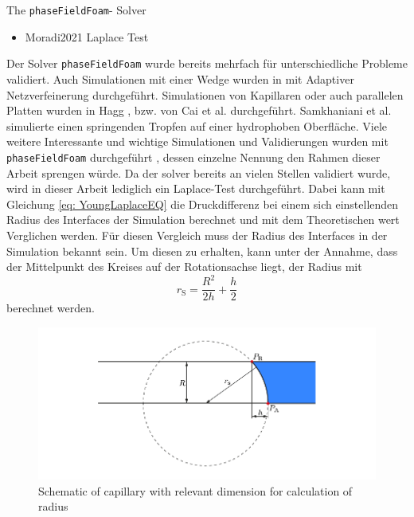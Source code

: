 The \texttt{phaseFieldFoam}- Solver 



\begin{itemize}
    \item Moradi2021 Laplace Test
\end{itemize}


Der Solver \texttt{phaseFieldFoam} wurde bereits mehrfach für unterschiedliche Probleme validiert. Auch Simulationen mit einer Wedge wurden in \cite{holzinger2021DirectNumericalSimulation} mit Adaptiver Netzverfeinerung durchgeführt. Simulationen von Kapillaren oder auch parallelen Platten wurden in Hagg \cite{hagg2019DirekteNumerischeSimulation}, bzw. von Cai et al. \cite{cai2015NumericalSimulationWetting} durchgeführt. Samkhaniani et al. \cite{samkhaniani2021BouncingDropImpingement} simulierte einen springenden Tropfen auf einer hydrophoben Oberfläche. Viele weitere Interessante und wichtige Simulationen und Validierungen wurden mit \texttt{phaseFieldFoam} durchgeführt \cite{bodziony2023StressfulWayDroplets,yinDirectNumericalSimulation,worner2021SpreadingReboundDynamics,bagheriInterfacialRelaxationCrucial2022}, dessen einzelne Nennung den Rahmen dieser Arbeit sprengen würde. 
Da der solver bereits an vielen Stellen validiert wurde, wird in dieser Arbeit lediglich ein Laplace-Test durchgeführt. Dabei kann mit Gleichung \ref{eq: YoungLaplaceEQ} die Druckdifferenz bei einem sich einstellenden Radius des Interfaces der Simulation berechnet und mit dem Theoretischen wert Verglichen werden. Für diesen Vergleich muss der Radius des Interfaces in der Simulation bekannt sein. Um diesen zu erhalten, kann unter der Annahme, dass der Mittelpunkt des Kreises auf der Rotationsachse liegt, der Radius mit 
\begin{equation}
    r_{\mathrm{S}} = \frac{R^2}{2h}+\frac{h}{2}
\end{equation}
berechnet werden. 
\begin{figure}[h]
    \centering
    \includegraphics[width=.95\textwidth]{Pictures/RadiusCalc.pdf}
    \caption{Schematic of capillary with relevant dimension for calculation of radius}
    \label{fig: RadiusCalc}
\end{figure}

